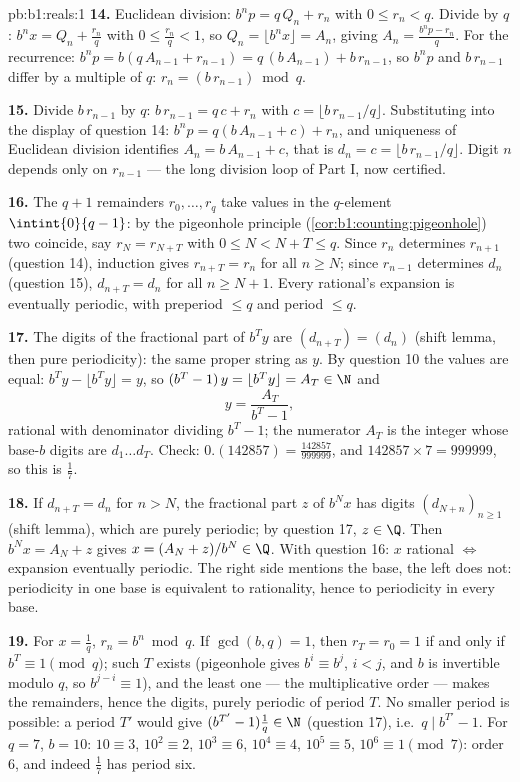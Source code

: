 \begin{solution}{pb:b1:reals:1}
\textbf{14.} Euclidean division: $b^n p = q\,Q_n + r_n$ with $0
\leq r_n < q$. Divide by $q$: $b^n x = Q_n + \frac{r_n}{q}$ with
$0 \leq \frac{r_n}{q} < 1$, so $Q_n = \lfloor b^n x \rfloor =
A_n$, giving $A_n = \frac{b^n p - r_n}{q}$. For the recurrence:
$b^n p = b(q\,A_{n-1} + r_{n-1}) = q\,(b\,A_{n-1}) +
b\,r_{n-1}$, so $b^n p$ and $b\,r_{n-1}$ differ by a multiple of
$q$: $r_n = (b\,r_{n-1}) \bmod q$.

\textbf{15.} Divide $b\,r_{n-1}$ by $q$: $b\,r_{n-1} = q\,c +
r_n$ with $c = \lfloor b\,r_{n-1}/q \rfloor$. Substituting into
the display of question 14: $b^n p = q(b\,A_{n-1} + c) + r_n$,
and uniqueness of Euclidean division identifies $A_n = b\,A_{n-1}
+ c$, that is $d_n = c = \lfloor b\,r_{n-1}/q \rfloor$. Digit
$n$ depends only on $r_{n-1}$ --- the long division loop of Part
I, now certified.

\textbf{16.} The $q + 1$ remainders $r_0, \dots, r_q$ take values
in the $q$-element  $\intint{0}{q-1}$: by the pigeonhole
principle (\cref{cor:b1:counting:pigeonhole}) two coincide, say
$r_N = r_{N+T}$ with $0 \leq N < N + T \leq q$. Since $r_n$
determines $r_{n+1}$ (question 14), induction gives $r_{n+T} =
r_n$ for all $n \geq N$; since $r_{n-1}$ determines $d_n$
(question 15), $d_{n+T} = d_n$ for all $n \geq N + 1$. Every
rational's expansion is eventually periodic, with preperiod $\leq
q$ and period $\leq q$.

\textbf{17.} The digits of the fractional part of $b^T y$ are
$(d_{n+T}) = (d_n)$ (shift lemma, then pure periodicity): the
same proper string as $y$. By question 10 the values are equal:
$b^T y - \lfloor b^T y \rfloor = y$, so $(b^T - 1)\,y = \lfloor
b^T y \rfloor = A_T \in \N$ and
\[
y = \frac{A_T}{b^T - 1} ,
\]
rational with denominator dividing $b^T - 1$; the numerator $A_T$
is the integer whose base-$b$ digits are $d_1 \dots d_T$. Check:
$0.(142857) = \frac{142857}{999999}$, and $142857 \times 7 =
999999$, so this is $\frac 17$.

\textbf{18.} If $d_{n+T} = d_n$ for $n > N$, the fractional part
$z$ of $b^N x$ has digits $(d_{N+n})_{n\geq1}$ (shift lemma),
which are purely periodic; by question 17, $z \in \Q$. Then $b^N
x = A_N + z$ gives $x = (A_N + z)/b^N \in \Q$. With question 16:
$x$ rational $\iff$ expansion eventually periodic. The right side
mentions the base, the left does not: periodicity in one base is
equivalent to rationality, hence to periodicity in every base.

\textbf{19.} For $x = \frac 1q$, $r_n = b^n \bmod q$. If
$\gcd(b, q) = 1$, then $r_T = r_0 = 1$ if and only if $b^T \equiv
1 \pmod q$; such $T$ exists (pigeonhole gives $b^i \equiv b^j$,
$i < j$, and $b$ is invertible modulo $q$, so $b^{j-i} \equiv
1$), and the least one --- the multiplicative order --- makes the
remainders, hence the digits, purely periodic of period $T$.
No smaller period is possible: a period $T'$ would give $(b^{T'}
- 1)\frac1q \in \N$ (question 17), i.e.\ $q \mid b^{T'} - 1$.
For $q = 7$, $b = 10$: $10 \equiv 3$, $10^2 \equiv 2$, $10^3
\equiv 6$, $10^4 \equiv 4$, $10^5 \equiv 5$, $10^6 \equiv 1
\pmod 7$: order $6$, and indeed $\frac 17$ has period six.


\end{solution}
